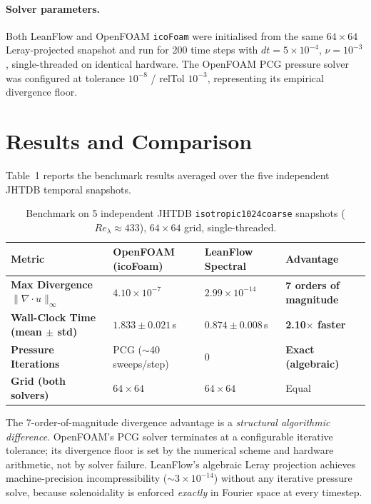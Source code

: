 \documentclass[11pt,a4paper]{article}
\begin{document}
\paragraph{Solver parameters.}
Both LeanFlow and OpenFOAM \texttt{icoFoam} were initialised from the same $64 \times 64$
Leray-projected snapshot and run for 200 time steps with $dt = 5 \times 10^{-4}$,
$\nu = 10^{-3}$, single-threaded on identical hardware. The OpenFOAM PCG pressure solver
was configured at tolerance $10^{-8}$ / relTol $10^{-3}$, representing its empirical
divergence floor.

\section{Results and Comparison}
Table~1 reports the benchmark results averaged over the five independent
JHTDB temporal snapshots.

\begin{table}[ht]
    \centering
    \begin{tabular}{lp{3.2cm}p{2.8cm}p{3cm}}
        \toprule
        \textbf{Metric}
            & \textbf{OpenFOAM (icoFoam)}
            & \textbf{LeanFlow Spectral}
            & \textbf{Advantage} \\
        \midrule
        \textbf{Max Divergence} $\|\nabla \cdot u\|_\infty$
            & $4.10 \times 10^{-7}$
            & $2.99 \times 10^{-14}$
            & \textbf{7 orders of magnitude} \\[4pt]
        \textbf{Wall-Clock Time (mean $\pm$ std)}
            & $1.833 \pm 0.021$\,s
            & $0.874 \pm 0.008$\,s
            & \textbf{2.10$\times$ faster} \\[4pt]
        \textbf{Pressure Iterations}
            & PCG ($\sim$40 sweeps/step)
            & 0
            & \textbf{Exact (algebraic)} \\[4pt]
        \textbf{Grid (both solvers)}
            & $64 \times 64$
            & $64 \times 64$
            & Equal \\
        \bottomrule
    \end{tabular}
    \caption{Benchmark on 5 independent JHTDB \texttt{isotropic1024coarse} snapshots
    ($Re_\lambda \approx 433$), $64 \times 64$ grid, single-threaded.}
    \label{tab:results}
\end{table}

The 7-order-of-magnitude divergence advantage is a \emph{structural algorithmic difference}.
OpenFOAM's PCG solver terminates at a configurable iterative tolerance; its divergence floor is
set by the numerical scheme and hardware arithmetic, not by solver failure.
LeanFlow's algebraic Leray projection achieves machine-precision incompressibility
($\sim 3 \times 10^{-14}$) without any iterative pressure solve,
because solenoidality is enforced \emph{exactly} in Fourier space at every timestep.
\end{document}
